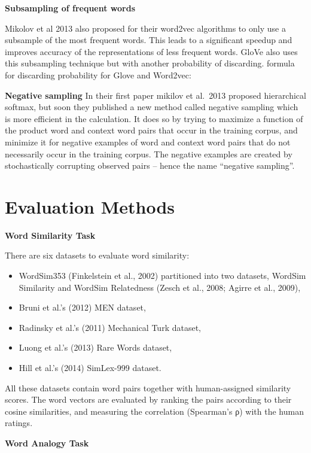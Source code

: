 \documentclass[]{krantz}
\providecommand{\tightlist}{%
  \setlength{\itemsep}{0pt}\setlength{\parskip}{0pt}}
\begin{document}
\textbf{Subsampling of frequent words}

Mikolov et al 2013 also proposed for their word2vec algorithms to only use a subsample of the most frequent words. This leads to a significant speedup and improves accuracy of the representations of less frequent words. GloVe also uses this subsampling technique but with another probability of discarding.
formula for discarding probability for Glove and Word2vec:

\textbf{Negative sampling}
In their first paper mikilov et al.~2013 proposed hierarchical softmax, but soon they published a new method called negative sampling which is more efficient in the calculation. It does so by trying to maximize a function of the product word and context word pairs that occur in the training corpus, and minimize it for negative examples of word and context word pairs that do not necessarily occur in the training corpus. The negative examples are created by stochastically corrupting observed pairs -- hence the name ``negative sampling''.

\hypertarget{evaluation-methods}{%
\section{Evaluation Methods}\label{evaluation-methods}}

\textbf{Word Similarity Task}

There are six datasets to evaluate word similarity:

\begin{itemize}
\tightlist
\item
  WordSim353 (Finkelstein et al., 2002) partitioned into two datasets, WordSim Similarity and WordSim Relatedness (Zesch et al., 2008; Agirre et al., 2009),
\item
  Bruni et al.'s (2012) MEN dataset,
\item
  Radinsky et al.'s (2011) Mechanical Turk dataset,
\item
  Luong et al.'s (2013) Rare Words dataset,
\item
  Hill et al.'s (2014) SimLex-999 dataset.
\end{itemize}

All these datasets contain word pairs together with human-assigned similarity scores. The word vectors are evaluated by ranking the pairs according to their cosine similarities, and measuring the correlation (Spearman's ρ) with the human ratings.

\textbf{Word Analogy Task}
\end{document}
